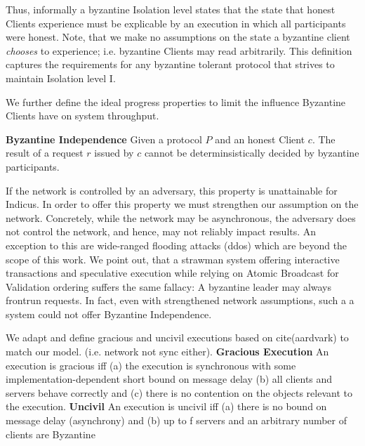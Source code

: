 Thus, informally a byzantine Isolation level states that the state that honest Clients experience must be explicable by an execution in which all participants were honest. Note, that we make no assumptions on the state a byzantine client \textit{chooses} to experience; i.e. byzantine Clients may read arbitrarily.
This definition captures the requirements for any byzantine tolerant protocol that strives to maintain Isolation level I.

We further define the ideal progress properties to limit the influence Byzantine Clients have on system throughput. 

\textbf{Byzantine Independence}
Given a protocol $P$ and an honest Client $c$. The result of a request $r$ issued by $c$ cannot be determinsistically decided by byzantine participants.  

If the network is controlled by an adversary, this property is unattainable for Indicus. 
In order to offer this property we must strengthen our assumption on the network. Concretely, while the network may be asynchronous, the adversary does not control the network, and hence, may not reliably impact results. 
An exception to this are wide-ranged flooding attacks (ddos) which are beyond the scope of this work.
We point out, that a strawman system offering interactive transactions and speculative execution while relying on Atomic Broadcast for Validation ordering suffers the same fallacy: A byzantine leader may always frontrun requests. In fact, even with strengthened network assumptions, such a a system could not offer Byzantine Independence.


We adapt and define gracious and uncivil executions based on cite(aardvark) to match our model. (i.e. network not sync either).
\textbf{Gracious Execution}
An execution is gracious iff (a) the execution is synchronous with some
implementation-dependent short bound on message delay (b) all clients and servers behave correctly and (c) there is no contention on the objects relevant to the execution.
\textbf{Uncivil}
An execution is uncivil iff (a) there is no bound on message delay (asynchrony) and (b) up to f servers and an arbitrary number of clients are Byzantine 